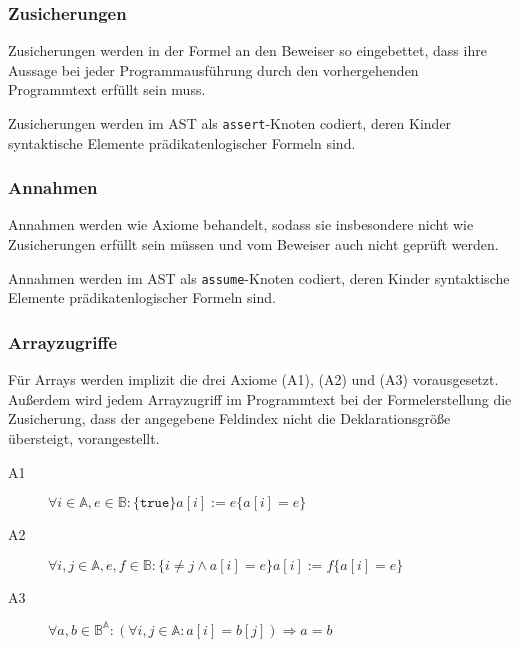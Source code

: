 \subsubsection{Zusicherungen}%

Zusicherungen werden in der Formel an den Beweiser so eingebettet,
dass ihre Aussage bei jeder Programmausführung durch den
vorhergehenden Programmtext erfüllt sein muss.%

Zusicherungen werden im AST als \texttt{assert}-Knoten codiert, deren
Kinder syntaktische Elemente prädikatenlogischer Formeln sind.%

\subsubsection{Annahmen}%

Annahmen werden wie Axiome behandelt, sodass sie insbesondere nicht
wie Zusicherungen erfüllt sein müssen und vom Beweiser auch nicht
geprüft werden.%

Annahmen werden im AST als \texttt{assume}-Knoten codiert,
deren Kinder syntaktische Elemente prädikatenlogischer Formeln sind.%

\subsubsection{Arrayzugriffe}%

Für Arrays werden implizit die drei Axiome (A1), (A2) und (A3)
vorausgesetzt. Außerdem wird jedem Arrayzugriff im Programmtext bei
der Formelerstellung die Zusicherung, dass der angegebene Feldindex
nicht die Deklarationsgröße übersteigt, vorangestellt.%

\begin{description}%
    \item[A1] \begin{math}\forall i \in \mathbb{A}, e \in \mathbb{B} : \{\texttt{true}\} a[i] := e \{a[i] = e\}\end{math}%
    \item[A2] \begin{math}\forall i, j \in \mathbb{A}, e, f \in \mathbb{B} : \{i \neq j \wedge a[i] = e\} a[i] := f \{a[i] = e\}\end{math}%
    \item[A3] \begin{math}\forall a, b \in \mathbb{B}^\mathbb{A} : (\forall i, j \in \mathbb{A} : a[i] = b[j]) \Rightarrow a = b\end{math}%
\end{description}%

